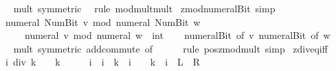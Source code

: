 \begin{isabellebody}
\ \ \isamarkupfalse%
\ mult{\isacharunderscore}{\kern0pt}{}\ {\isacharbrackleft}{\kern0pt}symmetric{\isacharbrackright}{\kern0pt}\ \isamarkupfalse%
\ {\isacharparenleft}{\kern0pt}rule\ mod{\isacharunderscore}{\kern0pt}mult{\isacharunderscore}{\kern0pt}mult{}{\isacharparenright}{\kern0pt}%
\endisatagproof
{\isafoldproof}%
%
\isadelimproof
\isanewline
%
\endisadelimproof
\isanewline
{}\isamarkupfalse%
\ zmod{\isacharunderscore}{\kern0pt}numeral{\isacharunderscore}{\kern0pt}Bit{}\ {\isacharbrackleft}{\kern0pt}simp{\isacharbrackright}{\kern0pt}{\isacharcolon}{\kern0pt}\isanewline
\ \ {\isachardoublequoteopen}numeral\ {\isacharparenleft}{\kern0pt}Num{\isachardot}{\kern0pt}Bit{}\ v{\isacharparenright}{\kern0pt}\ mod\ numeral\ {\isacharparenleft}{\kern0pt}Num{\isachardot}{\kern0pt}Bit{}\ w{\isacharparenright}{\kern0pt}\ {\isacharequal}{\kern0pt}\isanewline
\ \ \ \ {}\ {\isacharasterisk}{\kern0pt}\ {\isacharparenleft}{\kern0pt}numeral\ v\ mod\ numeral\ w{\isacharparenright}{\kern0pt}\ {\isacharplus}{\kern0pt}\ {\isacharparenleft}{\kern0pt}{}{\isacharcolon}{\kern0pt}{\isacharcolon}{\kern0pt}int{\isacharparenright}{\kern0pt}{\isachardoublequoteclose}\isanewline
%
\isadelimproof
\ \ %
\endisadelimproof
%
\isatagproof
{}\isamarkupfalse%
\ numeral{\isacharunderscore}{\kern0pt}Bit{}\ {\isacharbrackleft}{\kern0pt}of\ v{\isacharbrackright}{\kern0pt}\ numeral{\isacharunderscore}{\kern0pt}Bit{}\ {\isacharbrackleft}{\kern0pt}of\ w{\isacharbrackright}{\kern0pt}\isanewline
\ \ \isamarkupfalse%
\ mult{\isacharunderscore}{\kern0pt}{}\ {\isacharbrackleft}{\kern0pt}symmetric{\isacharbrackright}{\kern0pt}\ add{\isachardot}{\kern0pt}commute\ {\isacharbrackleft}{\kern0pt}of\ {\isacharunderscore}{\kern0pt}\ {}{\isacharbrackright}{\kern0pt}\isanewline
\ \ \isamarkupfalse%
\ {\isacharparenleft}{\kern0pt}rule\ pos{\isacharunderscore}{\kern0pt}zmod{\isacharunderscore}{\kern0pt}mult{\isacharunderscore}{\kern0pt}{}{\isacharcomma}{\kern0pt}\ simp{\isacharparenright}{\kern0pt}%
\endisatagproof
{\isafoldproof}%
%
\isadelimproof
\isanewline
%
\endisadelimproof
\isanewline
{}\isamarkupfalse%
\ zdiv{\isacharunderscore}{\kern0pt}eq{\isacharunderscore}{\kern0pt}{}{\isacharunderscore}{\kern0pt}iff{\isacharcolon}{\kern0pt}\isanewline
\ \ {\isachardoublequoteopen}i\ div\ k\ {\isacharequal}{\kern0pt}\ {}\ {\isasymlongleftrightarrow}\ k\ {\isacharequal}{\kern0pt}\ {}\ {\isasymor}\ {}\ {\isasymle}\ i\ {\isasymand}\ i\ {\isacharless}{\kern0pt}\ k\ {\isasymor}\ i\ {\isasymle}\ {}\ {\isasymand}\ k\ {\isacharless}{\kern0pt}\ i{\isachardoublequoteclose}\ {\isacharparenleft}{\kern0pt}\ {\isachardoublequoteopen}{\isacharquery}{\kern0pt}L\ {\isacharequal}{\kern0pt}\ {\isacharquery}{\kern0pt}R{\isachardoublequoteclose}{\isacharparenright}{\kern0pt}\isanewline

\end{isabellebody}
